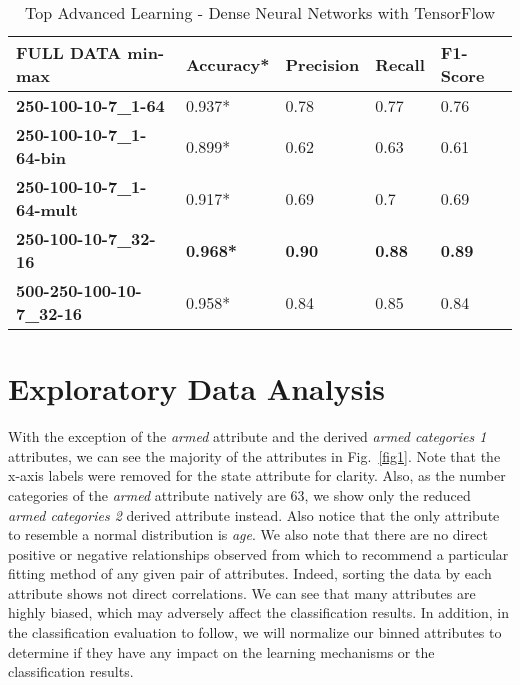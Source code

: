 \documentclass[10pt, conference, compsocconf]{IEEEtran}
\begin{document}
\begin{center}
	\begin{table}[t]
		\centering \footnotesize
		\vspace{0.01cm}
		\caption{Top Advanced Learning - Dense Neural Networks with TensorFlow}
		\hspace{1cm}
		\begin{tabularx}{\linewidth}{ l  X  X  X  X }
			\hline
			\textbf{FULL DATA min-max} &	\textbf{Accuracy*}&	\textbf{Precision}&	\textbf{Recall}&	\textbf{F1-Score} \\ \hline
			
			
			\textbf{250-100-10-7\_1-64}&	0.937*	&0.78&	0.77&	0.76\\ \hline
			\textbf{250-100-10-7\_1-64-bin}&	0.899*&	0.62&	0.63&	0.61\\ \hline
			\textbf{250-100-10-7\_1-64-mult}&	0.917*	&0.69&	0.7&	0.69\\ \hline
			\textbf{250-100-10-7\_32-16}&	\textbf{0.968*}&	\textbf{0.90}&	\textbf{0.88}&	\textbf{0.89}\\ \hline
			\textbf{500-250-100-10-7\_32-16}&	0.958*&	0.84&	0.85&	0.84\\ \hline
			
			
		\end{tabularx}\newline
		\vspace{-0.05cm}
		\label{Table8}
	\end{table} \hfil
\end{center}

\section{Exploratory Data Analysis}\label{eda}

With the exception of the \textit{armed} attribute and the derived \textit{armed categories 1} attributes, we can see the majority of the attributes in Fig.~\ref{fig1}. Note that the x-axis labels were removed for the state attribute for clarity. Also, as the number categories of the \textit{armed} attribute natively are 63, we show only the reduced \textit{armed categories 2} derived attribute instead. Also notice that the only attribute to resemble a normal distribution is \textit{age}. We also note that there are no direct positive or negative relationships observed from which to recommend a particular fitting method of any given pair of attributes. Indeed, sorting the data by each attribute shows not direct correlations. We can see that many attributes are highly biased, which may adversely affect the classification results. In addition, in the classification evaluation to follow, we will normalize our binned attributes to determine if they have any impact on the learning mechanisms or the classification results.
\end{document}
